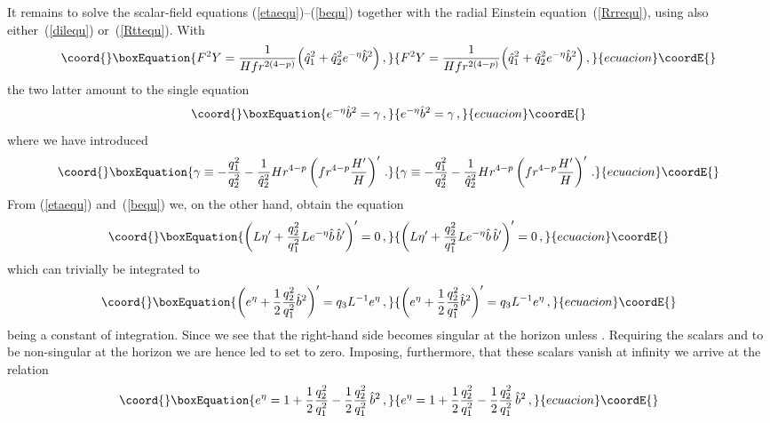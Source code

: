 \documentclass[a4paper,11pt]{article}
\providecommand{\qh}{\hat{q}} \providecommand{\hh}{\hat{h}}
\providecommand{\eqref}[1]{(\ref{#1})}
\begin{document}
It remains to solve the scalar-field equations
\eqref{etaequ}--\eqref{bequ} together with the radial Einstein
equation~\eqref{Rrrequ}, using also either~\eqref{dilequ}
or~\eqref{Rttequ}. With
%
\begin{equation}\coord{}\boxEquation{
\label{F2Yp}
F^2 Y = \frac{1}{H f r^{2(4-p)}} \Big( \qh_1^2+\qh_2^2 e^{-\eta}
\hat{b}^2 \Big)\,,
}{
F^2 Y = \frac{1}{H f r^{2(4-p)}} \Big( \qh_1^2+\qh_2^2 e^{-\eta}
\hat{b}^2 \Big)\,,
}{ecuacion}\coordE{}\end{equation}
%
the two latter amount to the single equation
%
\begin{equation}\coord{}\boxEquation{
\label{newdilequ} e^{-\eta} \hat{b}^2 = \gamma \,,
}{
e^{-\eta} \hat{b}^2 = \gamma \,,
}{ecuacion}\coordE{}\end{equation}
%
where we have introduced
%
\begin{equation}\coord{}\boxEquation{
\gamma \equiv -\frac{q_1^2}{q_2^2} - \frac{1}{\qh_2^2} H r^{4-p}
\left( f r^{4-p} \frac{H'}{H} \right)' \,.
}{
\gamma \equiv -\frac{q_1^2}{q_2^2} - \frac{1}{\qh_2^2} H r^{4-p}
\left( f r^{4-p} \frac{H'}{H} \right)' \,.
}{ecuacion}\coordE{}\end{equation}
%
From \eqref{etaequ} and~\eqref{bequ} we, on the other hand, obtain the
equation
%
\begin{equation}\coord{}\boxEquation{
\left( L \eta' + \frac{q_2^2}{q_1^2} L e^{-\eta} \hat{b} \, \hat{b}'
\right)' = 0 \,,
}{
\left( L \eta' + \frac{q_2^2}{q_1^2} L e^{-\eta} \hat{b} \, \hat{b}'
\right)' = 0 \,,
}{ecuacion}\coordE{}\end{equation}
%
which can trivially be integrated to
%
\begin{equation}\coord{}\boxEquation{
\label{q3eq} \left( e^\eta + \frac{1}{2} \frac{q_2^2}{q_1^2}
\hat{b}^2 \right)' = q_3 L^{-1} e^\eta \,,
}{
\left( e^\eta + \frac{1}{2} \frac{q_2^2}{q_1^2}
\hat{b}^2 \right)' = q_3 L^{-1} e^\eta \,,
}{ecuacion}\coordE{}\end{equation}
%
\coordHE{} being a constant of integration. Since \coordHE{} we see
that the right-hand side becomes singular at the horizon unless
\coordHE{}. Requiring the scalars \myHighlight{$\eta$}\coordHE{} and \coordHE{} to be non-singular
at the horizon we are hence led to set \coordHE{} to zero. Imposing,
furthermore, that these scalars vanish at infinity we arrive at the
relation
%
\begin{equation}\coord{}\boxEquation{
e^\eta = 1 + \frac{1}{2} \frac{q_2^2}{q_1^2} - \frac{1}{2}
\frac{q_2^2}{q_1^2}\, \hat{b}^2 \,,
}{
e^\eta = 1 + \frac{1}{2} \frac{q_2^2}{q_1^2} - \frac{1}{2}
\frac{q_2^2}{q_1^2}\, \hat{b}^2 \,,
}{ecuacion}\coordE{}\end{equation}
\end{document}
